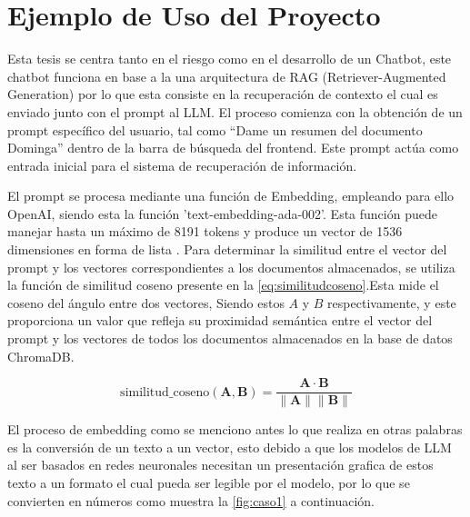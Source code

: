 \chapter{Ejemplo de Uso del Proyecto}

Esta tesis se centra tanto en el riesgo como en el desarrollo de un Chatbot, este chatbot funciona 
en base a la una arquitectura de RAG (Retriever-Augmented Generation) por lo que esta consiste en 
la recuperación de contexto el cual es enviado junto con el prompt al LLM. El proceso comienza con 
la obtención de un prompt específico del usuario, tal como ``Dame un resumen del documento Dominga'' 
dentro de la barra de búsqueda del frontend. Este prompt actúa como entrada inicial para el sistema 
de recuperación de información.


El prompt se procesa mediante una función de Embedding, empleando para ello OpenAI, siendo esta  
la función 'text-embedding-ada-002'. Esta función puede manejar hasta un máximo de 8191 tokens y 
produce un vector de 1536 dimensiones en forma de lista \cite{openai1}. Para determinar la similitud entre el 
vector del prompt y los vectores correspondientes a los documentos almacenados, se utiliza la función 
de similitud coseno presente en la \autoref{eq:similitudcoseno}.Esta mide el coseno del ángulo entre dos vectores,
Siendo estos $A$ y $B$ respectivamente, y este proporciona un valor que refleja su proximidad semántica entre el vector
del prompt y los vectores de todos los documentos almacenados en la base de datos ChromaDB.

\begin{equation}
    \text{similitud\_coseno}(\mathbf{A}, \mathbf{B}) = \frac{\mathbf{A} \cdot \mathbf{B}}{\|\mathbf{A}\| \|\mathbf{B}\|}
    \label{eq:similitudcoseno}
\end{equation}


El proceso de embedding como se menciono antes lo que realiza en otras palabras es la conversión de un texto a un vector, esto debido a que los modelos de LLM al ser basados 
en redes neuronales necesitan un presentación grafica de estos texto a un formato el cual pueda ser legible por el modelo, por lo que se convierten en números como muestra la 
\autoref{fig:caso1} a continuación.

